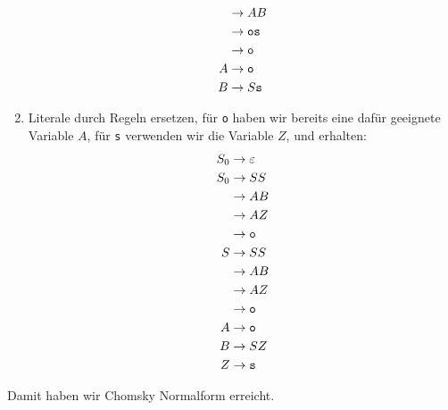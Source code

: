 \begin{loesung}
\begin{enumerate}
\begin{align*}
 &\rightarrow AB\\
 &\rightarrow {\tt o}{\tt s}\\
 &\rightarrow {\tt o}\\
A&\rightarrow {\tt o}\\
B&\rightarrow S{\tt s}
\end{align*}
\item Literale durch Regeln ersetzen, für {\tt o} haben wir bereits
eine dafür geeignete Variable  $A$, für {\tt s} verwenden wir die
Variable $Z$, und erhalten:
\begin{align*}
S_0&\rightarrow \varepsilon\\
S_0&\rightarrow SS\\
   &\rightarrow AB\\
   &\rightarrow AZ\\
   &\rightarrow {\tt o}\\
S&\rightarrow SS\\
 &\rightarrow AB\\
 &\rightarrow AZ\\
 &\rightarrow {\tt o}\\
A&\rightarrow {\tt o}\\
B&\rightarrow SZ\\
Z&\rightarrow {\tt s}
\end{align*}
\end{enumerate}
Damit haben wir Chomsky Normalform erreicht.
\end{loesung}
